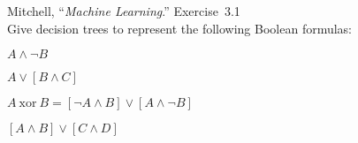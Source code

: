 \begin{problem}
  Mitchell, ``\textit{Machine Learning}.'' Exercise~3.1\\
  \textnormal{Give decision trees to represent the following Boolean formulas:}
\end{problem}

\begin{subproblem}
  $A \wedge \lnot B$
\end{subproblem}



\begin{subproblem}
  $A \vee [B \wedge C] $
\end{subproblem}



\begin{subproblem}
  $A~\text{xor}~B =  [\lnot A \wedge B] \vee [A \wedge \lnot B]$
\end{subproblem}



\newpage
\begin{subproblem}
  $[A \wedge B] \vee [C \wedge D]$
\end{subproblem}



